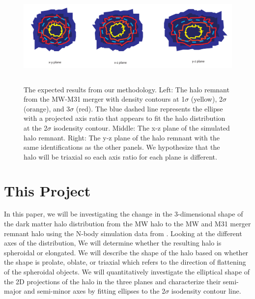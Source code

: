 \documentclass[linenumbers, twocolumn]{aastex631}
\begin{document}
\begin{figure}
    \centering
    \includegraphics[width=\textwidth,height=5cm]{figures/ASTR400B_project_diagram.pdf}
    \caption{The expected results from our methodology. Left: The halo remnant from the MW-M31 merger with density contours at 1$\sigma$ (yellow), 2$\sigma$ (orange), and 3$\sigma$ (red). The blue dashed line represents the ellipse with a projected axis ratio that appears to fit the halo distribution at the 2$\sigma$ isodensity contour. Middle: The x-z plane of the simulated halo remnant. Right: The y-z plane of the halo remnant with the same identifications as the other panels. We hypothesize that the halo will be triaxial so each axis ratio for each plane is different.}
    \label{fig:method_fig}
\end{figure}



\section{This Project} \label{sec:project}
In this paper, we will be investigating the change in the 3-dimensional shape of the dark matter halo distribution from the MW halo to the MW and M31 merger remnant halo using the N-body simulation data from \cite{2012VanDerMarel}. 
Looking at the different axes of the distribution, We will determine whether the resulting halo is spheroidal or elongated. 
We will describe the shape of the halo based on whether the shape is prolate, oblate, or triaxial which refers to the direction of flattening of the spheroidal objects.
We will quantitatively investigate the elliptical shape of the 2D projections of the halo in the three planes and characterize their semi-major and semi-minor axes by fitting ellipses to the 2$\sigma$ isodensity contour line.
\end{document}
